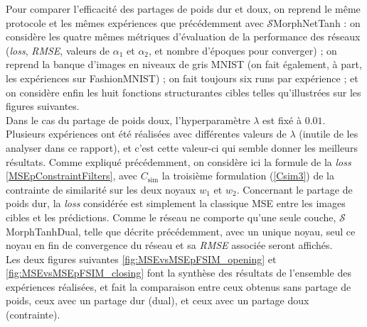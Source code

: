 Pour comparer l'efficacité des partages de poids dur et doux, on reprend le même protocole et les mêmes expériences que précédemment avec $\mathcal{S}$MorphNetTanh : on considère les quatre mêmes métriques d'évaluation de la performance des réseaux (\textit{loss}, \textit{RMSE}, valeurs de $\alpha_1$ et $\alpha_2$, et nombre d'époques pour converger) ; on reprend la banque d'images en niveaux de gris MNIST (on fait également, à part, les expériences sur FashionMNIST) ; on fait toujours six runs par expérience ; et on considère enfin les huit fonctions structurantes cibles telles qu'illustrées sur les figures suivantes. \\

\vspace{-2.0mm}
\noindent Dans le cas du partage de poids doux, l'hyperparamètre $\lambda$ est fixé à $0.01$. Plusieurs expériences ont été réalisées avec différentes valeurs de $\lambda$ (inutile de les analyser dans ce rapport), et c'est cette valeur-ci qui semble donner les meilleurs résultats. Comme expliqué précédemment, on considère ici la formule de la \textit{loss} \ref{MSEpConstraintFilters}, avec $C_\text{sim}$ la troisième formulation (\ref{Csim3}) de la contrainte de similarité sur les deux noyaux $w_1$ et $w_2$.
Concernant le partage de poids dur, la \textit{loss} considérée est simplement la classique MSE entre les images cibles et les prédictions. Comme le réseau ne comporte qu'une seule couche, $\mathcal{S}$MorphTanhDual, telle que décrite précédemment, avec un unique noyau, seul ce noyau en fin de convergence du réseau et sa \textit{RMSE} associée seront affichés. \\

\vspace{-0.4mm}
Les deux figures suivantes \ref{fig:MSEvsMSEpFSIM_opening} et \ref{fig:MSEvsMSEpFSIM_closing} font la synthèse des résultats de l'ensemble des expériences réalisées, et fait la comparaison entre ceux obtenus sans partage de poids, ceux avec un partage dur (dual), et ceux avec un partage doux (contrainte).



